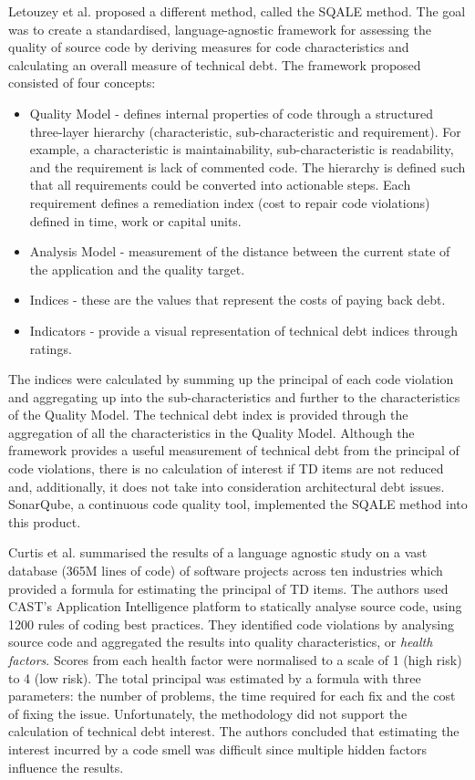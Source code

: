 \documentclass{mprop}
\begin{document}
Letouzey et al. \cite{Letouzey2012} proposed a different method, called the SQALE
method. The goal was to create a standardised, language-agnostic framework for
assessing the quality of source code by deriving measures for code
characteristics and calculating an overall measure of technical debt. The
framework proposed consisted of four concepts:
\begin{itemize}
	\item Quality Model - defines internal properties of code through a
	      structured three-layer hierarchy (characteristic, sub-characteristic
	      and requirement). For example, a characteristic is maintainability,
	      sub-characteristic is readability, and the requirement is lack of
	      commented code. The hierarchy is defined such that all requirements
	      could be converted into actionable steps. Each requirement defines a
	      remediation index (cost to repair code violations) defined in time,
	      work or capital units.
	\item Analysis Model - measurement of the distance between the current state
	      of the application and the quality target.
	\item Indices - these are the values that represent the costs of paying
	      back debt.
	\item Indicators - provide a visual representation of technical debt indices
	      through ratings.
\end{itemize}
The indices were calculated by summing up the principal of each code violation
and aggregating up into the sub-characteristics and further to the
characteristics of the Quality Model. The technical debt index is provided
through the aggregation of all the characteristics in the Quality Model.
Although the framework provides a useful measurement of technical debt from the
principal of code violations, there is no calculation of interest if TD items
are not reduced and, additionally, it does not take into consideration
architectural debt issues. SonarQube, a continuous code quality tool,
implemented the SQALE method into this product.

Curtis et al. \cite{Curtis2012} summarised the results of a language agnostic
study on a vast database (365M lines of code) of software projects across ten
industries which provided a formula for estimating the principal of TD items.
The authors used CAST's Application Intelligence platform to statically analyse
source code, using 1200 rules of coding best practices. They identified code
violations by analysing source code and aggregated the results into quality
characteristics, or \textit{health factors}. Scores from each health factor were
normalised to a scale of 1 (high risk) to 4 (low risk). The total principal was
estimated by a formula with three parameters: the number of problems, the time
required for each fix and the cost of fixing the issue. Unfortunately, the
methodology did not support the calculation of technical debt interest. The
authors concluded that estimating the interest incurred by a code smell was
difficult since multiple hidden factors influence the results.
\end{document}
